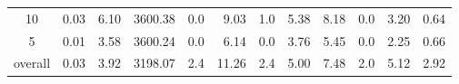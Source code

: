 \begin{table}[H]
\begin{tabular}{c rrrr rr rrr rr}
      10 &           0.03 &        6.10 &    3600.38 &  0.0 &         9.03 &      1.0 &          5.38 &          8.18 &      0.0 &             3.20 & 0.64 \\
       5 &           0.01 &        3.58 &    3600.24 &  0.0 &         6.14 &      0.0 &          3.76 &          5.45 &      0.0 &             2.25 & 0.66 \\
\midrule
 overall &           0.03 &        3.92 &    3198.07 &  2.4 &        11.26 &      2.4 &          5.00 &          7.48 &      2.0 &             5.12 & 2.92 \\
\bottomrule
\end{tabular}
\end{table}